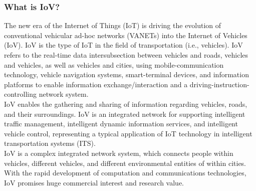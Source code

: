 			\subsubsection{What is IoV?}
			The new era of the Internet of Things (IoT) is driving the evolution of conventional vehicular ad-hoc networks (VANETs) into the Internet of Vehicles (IoV). IoV is the type of IoT in the field of transportation (i.e., vehicles). IoV refers to the real-time data intersubsection between vehicles and roads, vehicles and vehicles, as well as vehicles and cities, using mobile-communication technology, vehicle navigation systems, smart-terminal devices, and information platforms to enable information exchange/interaction and a driving-instruction-controlling network system. \\
			IoV enables the gathering and sharing of information regarding vehicles, roads, and their surroundings. IoV is an integrated network for supporting intelligent traffic management, intelligent dynamic information services, and intelligent vehicle control, representing a typical application of IoT technology in intelligent transportation systems (ITS). \\
			IoV is a complex integrated network system, which connects people within vehicles, different vehicles, and different environmental entities of within cities. With the rapid development of computation and communications technologies, IoV promises huge commercial interest and research value. 
			
